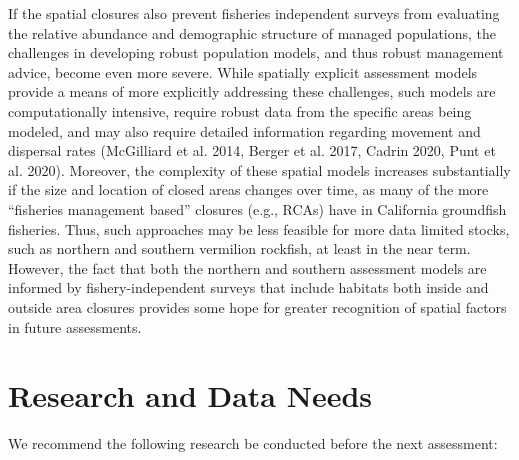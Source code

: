 \documentclass[11pt,
  english,
]{article}
\begin{document}
If the spatial closures also prevent fisheries independent surveys from evaluating the relative abundance and demographic structure of managed populations, the challenges in developing robust population models, and thus robust management advice, become even more severe. While spatially explicit assessment models provide a means of more explicitly addressing these challenges, such models are computationally intensive, require robust data from the specific areas being modeled, and may also require detailed information regarding movement and dispersal rates {(McGilliard et al. 2014, Berger et al. 2017, Cadrin 2020, Punt et al. 2020)\leavevmode\tagmcend\tagstructend}. Moreover, the complexity of these spatial models increases substantially if the size and location of closed areas changes over time, as many of the more ``fisheries management based'' closures (e.g., RCAs) have in California groundfish fisheries. Thus, such approaches may be less feasible for more data limited stocks, such as northern and southern vermilion rockfish, at least in the near term. However, the fact that both the northern and southern assessment models are informed by fishery-independent surveys that include habitats both inside and outside area closures provides some hope for greater recognition of spatial factors in future assessments.


\hypertarget{research-and-data-needs-1}{%
\section{Research and Data Needs}\label{research-and-data-needs-1}}

\leavevmode\tagmcend\tagstructend

We recommend the following research be conducted before the next assessment:

\end{document}
